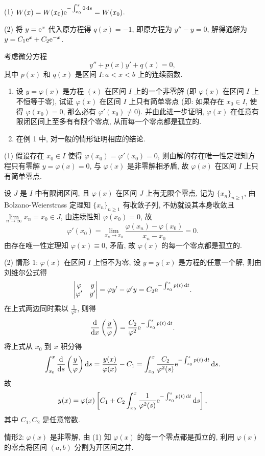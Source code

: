 \begin{solution}
  (1) $W(x)=W(x_0)\mathrm{e}^{-\int_{x_0}^x0\mathop{}\!\mathrm{d} s}=W(x_0)$.

  (2) 将 $y=\mathrm{e}^x$ 代入原方程得 $q(x)=-1$, 即原方程为 $y''-y=0$, 解得通解为 $y=C_1\mathrm{e}^x+C_2\mathrm{e}^{-x}$.
\end{solution}



\begin{exercise}
  考虑微分方程
  \begin{equation}
    y''+p(x)y'+q(x)=0, \tag{$\star$}
  \end{equation}
  其中 $p(x)$ 和 $q(x)$ 是区间 $I:a<x<b$ 上的连续函数.
  \begin{enumerate}[(1)]
  \item 设 $y=\varphi(x)$ 是方程 $(\star)$ 在区间 $I$ 上的一个非零解
  (即 $\varphi(x)$ 在区间 $I$ 上不恒等于零), 
  试证 $\varphi(x)$ 在区间 $I$ 上只有简单零点
  (即: 如果存在 $x_0\in I$, 使得 $\varphi(x_0)=0$, 那么必有 $\varphi'(x_0)\neq 0$). 
  并由此进一步证明, $\varphi(x)$ 在任意有限闭区间上至多有有限个零点, 从而每一个零点都是孤立的.
  \item 在例 1 中, 对一般的情形证明相应的结论.
  \end{enumerate}
\end{exercise}

\begin{solution}
  (1) 假设存在 $x_0\in I$ 使得 $\varphi(x_0)=\varphi'(x_0)=0$, 
  则由解的存在唯一性定理知方程只有零解 $y=\varphi(x)=0$, 与 $\varphi(x)$ 是非零解相矛盾, 
  故 $\varphi(x)$ 在区间 $I$ 上只有简单零点.

  设 $J$ 是 $I$ 中有限闭区间, 且 $\varphi(x)$ 在区间 $J$ 上有无限个零点, 记为 $\{x_n\}_{n\geq 1}$, 
  由 Bolzano-Weierstrass 定理知 $\{x_n\}_{n\geq 1}$ 有收敛子列,
  不妨就设其本身收敛且 $\lim\limits_{n\to\infty}x_n=x_0\in J$, 由连续性知 $\varphi(x_0)=0$, 故
  \[\varphi'(x_0)=\lim_{x_n\to x_0}\frac{\varphi(x_n)-\varphi(x_0)}{x_n-x_0}=0.\]
  由存在唯一性定理知 $\varphi(x)\equiv 0$, 矛盾, 故 $\varphi(x)$ 的每一个零点都是孤立的.

  (2) 情形 1: $\varphi(x)$ 在区间 $I$ 上恒不为零, 设 $y=y(x)$ 是方程的任意一个解, 则由刘维尔公式得
  \[\begin{vmatrix}\varphi&y\\\varphi'&y'\end{vmatrix}
    = \varphi y'-\varphi'y=C_2\mathrm{e}^{-\int_{x_0}^xp(t)\mathop{}\!\mathrm{d} t}.\]
  在上式两边同时乘以 $\frac{1}{\varphi^2}$, 则得
  \[\frac{\mathop{}\!\mathrm{d}}{\mathop{}\!\mathrm{d} x}\left(\frac{y}{\varphi}\right)
    = \frac{C_2}{\varphi^2}\mathrm{e}^{-\int_{x_0}^xp(t)\mathop{}\!\mathrm{d} t}.\]
  将上式从 $x_0$ 到 $x$ 积分得
  \[\int_{x_0}^x\frac{\mathop{}\!\mathrm{d}}{\mathop{}\!\mathrm{d} s}\left(\frac{y}{\varphi}\right)\mathop{}\!\mathrm{d} s
    = \frac{y(x)}{\varphi(x)}-C_1
    = \int_{x_0}^x\frac{C_2}{\varphi^2(s)}\mathrm{e}^{-\int_{x_0}^sp(t)\mathop{}\!\mathrm{d} t}\mathop{}\!\mathrm{d} s.\]
  故
  \[y(x) = \varphi(x)\left[C_1+C_2\int_{x_0}^x\frac{1}{\varphi^2(s)}\mathrm{e}^{-\int_{x_0}^sp(t)\mathop{}\!\mathrm{d} t}\mathop{}\!\mathrm{d} s\right],\]
  其中 $C_1,C_2$ 是任意常数.

  情形2: $\varphi(x)$ 是非零解, 由 (1) 知 $\varphi(x)$ 的每一个零点都是孤立的, 
  利用 $\varphi(x)$ 的零点将区间 $(a,b)$ 分割为开区间之并.
\end{solution}



